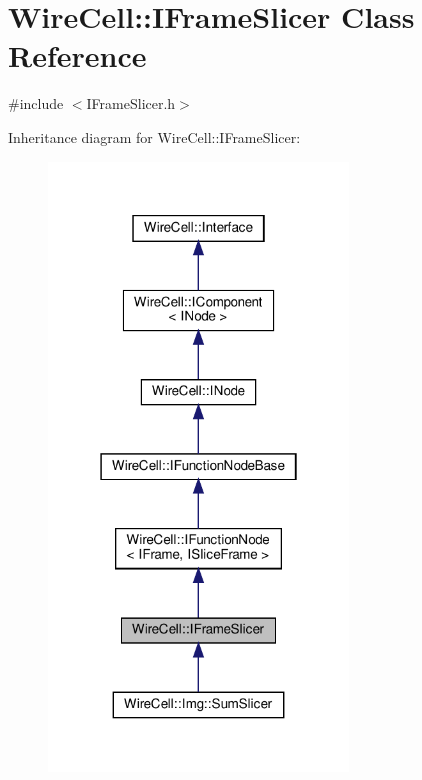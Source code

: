 \hypertarget{class_wire_cell_1_1_i_frame_slicer}{}\section{Wire\+Cell\+:\+:I\+Frame\+Slicer Class Reference}
\label{class_wire_cell_1_1_i_frame_slicer}


{\ttfamily \#include $<$I\+Frame\+Slicer.\+h$>$}



Inheritance diagram for Wire\+Cell\+:\+:I\+Frame\+Slicer\+:
\nopagebreak
\begin{figure}[H]
\begin{center}
\leavevmode
\includegraphics[width=226pt]{class_wire_cell_1_1_i_frame_slicer__inherit__graph}
\end{center}
\end{figure}


